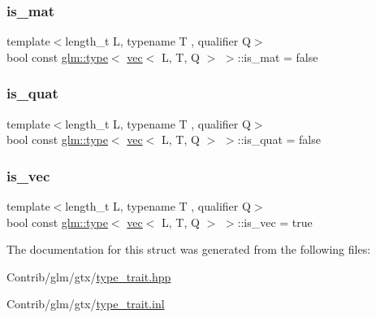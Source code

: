 \mbox{\label{structglm_1_1type_3_01vec_3_01_l_00_01_t_00_01_q_01_4_01_4_a22bba98c88e09815e508383d406fcbab}} 
\subsubsection{\texorpdfstring{is\+\_\+mat}{is\_mat}}
{\footnotesize\ttfamily template$<$length\+\_\+t L, typename T , qualifier Q$>$ \\
bool const \mbox{\hyperlink{structglm_1_1type}{glm\+::type}}$<$ \mbox{\hyperlink{structglm_1_1vec}{vec}}$<$ L, T, Q $>$ $>$\+::is\+\_\+mat = false\hspace{0.3cm}{\ttfamily [static]}}

\mbox{\label{structglm_1_1type_3_01vec_3_01_l_00_01_t_00_01_q_01_4_01_4_a3ffd0878bcefe94549e17188bfb500d5}} 
\subsubsection{\texorpdfstring{is\+\_\+quat}{is\_quat}}
{\footnotesize\ttfamily template$<$length\+\_\+t L, typename T , qualifier Q$>$ \\
bool const \mbox{\hyperlink{structglm_1_1type}{glm\+::type}}$<$ \mbox{\hyperlink{structglm_1_1vec}{vec}}$<$ L, T, Q $>$ $>$\+::is\+\_\+quat = false\hspace{0.3cm}{\ttfamily [static]}}

\mbox{\label{structglm_1_1type_3_01vec_3_01_l_00_01_t_00_01_q_01_4_01_4_a43041d99d1a7516c028d1f8dd8ac7daf}} 
\subsubsection{\texorpdfstring{is\+\_\+vec}{is\_vec}}
{\footnotesize\ttfamily template$<$length\+\_\+t L, typename T , qualifier Q$>$ \\
bool const \mbox{\hyperlink{structglm_1_1type}{glm\+::type}}$<$ \mbox{\hyperlink{structglm_1_1vec}{vec}}$<$ L, T, Q $>$ $>$\+::is\+\_\+vec = true\hspace{0.3cm}{\ttfamily [static]}}



The documentation for this struct was generated from the following files\+:\begin{DoxyCompactItemize}
\item 
Contrib/glm/gtx/\mbox{\hyperlink{type__trait_8hpp}{type\+\_\+trait.\+hpp}}\item 
Contrib/glm/gtx/\mbox{\hyperlink{type__trait_8inl}{type\+\_\+trait.\+inl}}\end{DoxyCompactItemize}
